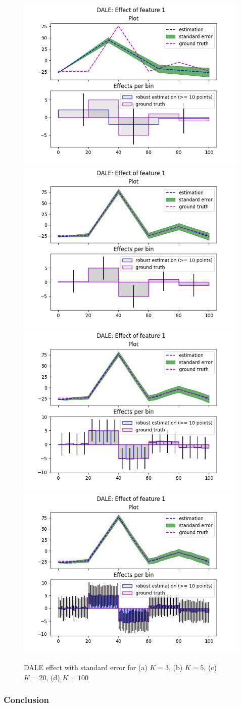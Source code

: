 \documentclass{article}
\begin{document}
\begin{figure}[!h]
  \centering
  \includegraphics[width=.49\linewidth]{bullet_1/im_9.png}
  \includegraphics[width=.49\linewidth]{bullet_1/im_10.png}\\
  \includegraphics[width=.49\linewidth]{bullet_1/im_11.png}
  \includegraphics[width=.49\linewidth]{bullet_1/im_12.png}
  \caption{DALE effect with standard error for (a) \(K = 3\), (b)
    \(K = 5\), (c) \(K = 20\), (d) \(K = 100\)}
  \label{fig:bullet-1-im-3}
\end{figure}

\subsubsection*{Conclusion}
\end{document}
